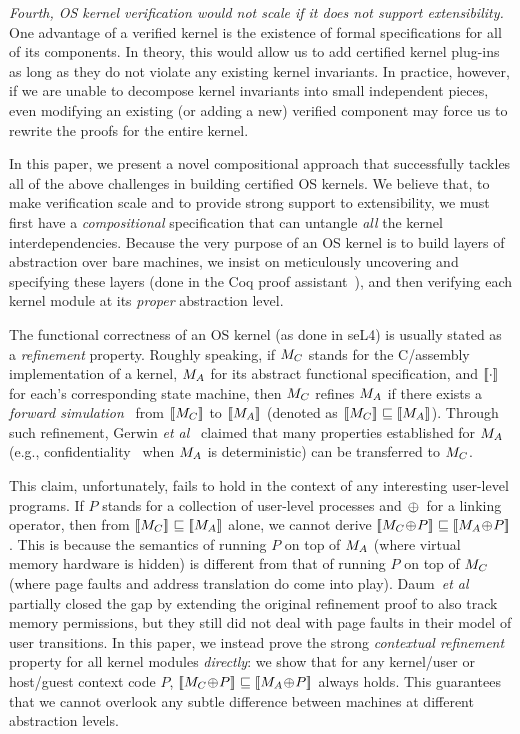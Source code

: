{{\em Fourth, OS kernel verification would not scale if it does not 
support extensibility.} One advantage of a verified
kernel is the existence of formal specifications for all of its
components. In theory, this would allow us to add certified
kernel plug-ins
~\cite{shao10:ctos} 
as long as they do not violate any existing kernel invariants. In
practice, however, if we are unable to decompose kernel invariants
into small independent pieces, even modifying an existing (or adding a
new) verified component may force us to rewrite the proofs for the
entire kernel.

In this paper, we present a novel compositional approach that
successfully tackles all of the above challenges in building certified
OS kernels. We believe that, to make verification scale and to provide
strong support to extensibility, we must first have a {\em
  compositional} specification that can untangle {\em all} the kernel
interdependencies. Because the very purpose of an OS kernel is to
build layers of abstraction over bare machines, we insist on
meticulously uncovering and specifying these layers (done in the Coq
proof assistant~\cite{coq}), and then verifying each kernel module at
its {\em proper} abstraction level.

The functional correctness of an OS kernel (as done in seL4) is
usually stated as a {\em refinement} property. Roughly speaking, if
$M_C$ stands for the C/assembly implementation of a kernel, $M_A$
for its abstract functional specification, and $[\![\cdot]\!]_{}$ for
each's corresponding state machine, then $M_C$ refines $M_A$ if
there exists a {\em forward simulation}~\cite{Lynch95} from
$[\![M_C]\!]_{}$ to $[\![M_A]\!]_{}$ (denoted as $[\![M_C]\!]_{} \sqsubseteq
[\![M_A]\!]_{}$).  Through such refinement, Gerwin {\em et
  al}~\cite{klein14,murray13,sewell11,sewell13} claimed that many
properties established for $M_A$ (e.g.,
confidentiality~\cite{murray13} when $M_A$ is deterministic) can be
transferred to $M_C$.

This claim, unfortunately, fails to hold in the context of any
interesting user-level programs. If $P$ stands for a collection of
user-level processes and $\;\!\oplus\!\;$ for a linking operator, then from
$[\![M_C]\!]_{} \sqsubseteq [\![M_A]\!]_{}$ alone, we cannot derive
$\sem{}{\mimp\join{}P} \Refrel \sem{}{\mabs\join{}P}$. This is because
the semantics of running $P$ on top of $M_A$ (where virtual memory
hardware is hidden) is different from that of running $P$ on top of
$M_C$ (where page faults and address translation do come into play).
Daum~{\em et al}~\cite{daum14} partially closed the gap by extending
the original refinement proof to also track memory permissions, but
they still did not deal with page faults in their model of user
transitions.  In this paper, we instead prove the strong {\em
  contextual refinement} property for all kernel modules {\em
  directly}: we show that for any kernel/user or host/guest context
code $P$, $\sem{}{\mimp\join{}P} \Refrel \sem{}{\mabs\join{}P}$ always
holds. This guarantees that we cannot overlook any subtle difference
between machines at different abstraction levels.

}
